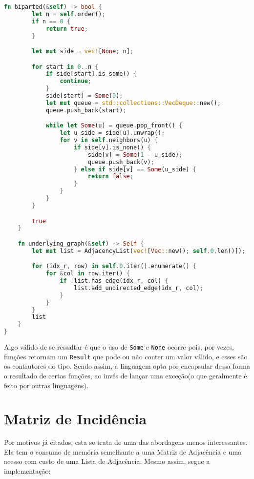 \begin{lstlisting}[language=Rust, caption={Implementação de Graph na Estrutura de Dados Matriz de Adjacência}, label=list:impl_adj_list_g]
    fn biparted(&self) -> bool {
        let n = self.order();
        if n == 0 {
            return true;
        }

        let mut side = vec![None; n];

        for start in 0..n {
            if side[start].is_some() {
                continue;
            }
            side[start] = Some(0);
            let mut queue = std::collections::VecDeque::new();
            queue.push_back(start);

            while let Some(u) = queue.pop_front() {
                let u_side = side[u].unwrap();
                for v in self.neighbors(u) {
                    if side[v].is_none() {
                        side[v] = Some(1 - u_side);
                        queue.push_back(v);
                    } else if side[v] == Some(u_side) {
                        return false;
                    }
                }
            }
        }

        true
    }

    fn underlying_graph(&self) -> Self {
        let mut list = AdjacencyList(vec![Vec::new(); self.0.len()]);

        for (idx_r, row) in self.0.iter().enumerate() {
            for &col in row.iter() {
                if !list.has_edge(idx_r, col) {
                    list.add_undirected_edge(idx_r, col);
                }
            }
        }
        list
    }
}
\end{lstlisting}

Algo válido de se ressaltar é que o uso de \texttt{Some} e \texttt{None} ocorre pois, por vezes, funções retornam um \texttt{Result} que pode ou não conter um valor válido, e esses são os contrutores do tipo. Sendo assim, a linguagem opta por encapsular dessa forma o resultado de certas funções, ao invés de lançar uma exceção(o que geralmente é feito por outras linguagens).

\section{Matriz de Incidência}

Por motivos já citados, esta se trata de uma das abordagens menos interessantes. Ela tem o consumo de memória semelhante a uma Matriz de Adjacência e uma acesso com custo de uma Lista de Adjacência. Mesmo assim, segue a implementação:

